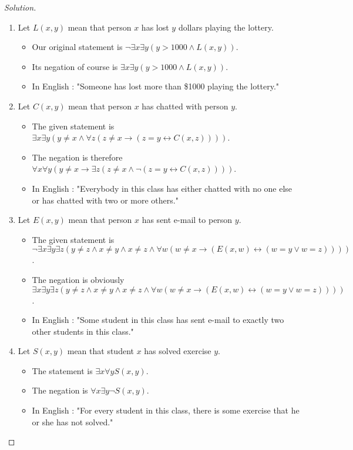 \documentclass{article}
\newenvironment{solution}{\renewcommand\qedsymbol{}\begin{proof}[Solution]}{\end{proof}}
\begin{document}
\begin{solution}
\hspace{1pt} 

\begin{enumerate}[leftmargin=16pt, topsep = 8pt]
\item Let $L(x,y)$ mean that person $x$ has lost $y$ dollars playing the lottery.
\begin{itemize}[leftmargin=0pt, topsep = 0pt]
\item Our original statement is $\neg \exists x \exists y(y > 1000 \land L(x,y))$.
\item Its negation of course is $\exists x \exists y(y > 1000 \land L(x,y))$.
\item In English : "Someone has lost more than \$1000 playing the lottery."
\end{itemize}
\item Let $C(x,y)$ mean that person $x$ has chatted with person $y$.
\begin{itemize}[leftmargin=0pt, topsep = 0pt]
\item The given statement is $\exists x \exists y(y \neq x \land \forall z(z \neq x \rightarrow (z = y \leftrightarrow C(x,z))))$.
\item The negation is therefore $\forall x \forall y(y \neq x \rightarrow \exists z(z \neq x \land \neg (z = y \leftrightarrow C(x,z))))$.
\item In English : "Everybody in this class has either chatted with no one else or has chatted with two or more others."
\end{itemize}
\item Let $E(x,y)$ mean that person $x$ has sent e-mail to person $y$.
\begin{itemize}[leftmargin=0pt, topsep = 0pt]
\item The given statement is $\neg \exists x \exists y \exists z(y \neq z \land x \neq y \land x \neq z \land \forall w(w \neq x \rightarrow (E(x,w) \leftrightarrow (w = y \lor w = z))))$.
\item The negation is obviously $\exists x \exists y \exists z(y \neq z \land x \neq y \land x \neq z \land \forall w(w \neq x \rightarrow (E(x,w) \leftrightarrow (w = y \lor w = z))))$.
\item In English : "Some student in this class has sent e-mail to exactly two other students in this class."
\end{itemize}
\item Let $S(x,y)$ mean that student $x$ has solved exercise $y$.
\begin{itemize}[leftmargin=0pt, topsep = 0pt]
\item The statement is $\exists x \forall y S(x,y)$.
\item The negation is $\forall x \exists y \neg S(x,y)$.
\item In English : "For every student in this class, there is some exercise that he or she has not solved."
\end{itemize}


\end{enumerate}
\end{solution}
\end{document}
